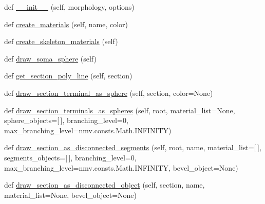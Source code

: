 \begin{DoxyCompactItemize}
\item 
def \hyperlink{classmeshy_1_1neuromorphovis_1_1builders_1_1skeleton_1_1skeleton__builder_1_1SkeletonBuilder_a26a5bc92b63c2dfc816c22da8e49f44f}{\+\_\+\+\_\+init\+\_\+\+\_\+} (self, morphology, options)
\item 
def \hyperlink{classmeshy_1_1neuromorphovis_1_1builders_1_1skeleton_1_1skeleton__builder_1_1SkeletonBuilder_aa112a3e82023451da265159ab6728535}{create\+\_\+materials} (self, name, color)
\item 
def \hyperlink{classmeshy_1_1neuromorphovis_1_1builders_1_1skeleton_1_1skeleton__builder_1_1SkeletonBuilder_a2c4bbfe9ee3f1a83360a3e31b442d56b}{create\+\_\+skeleton\+\_\+materials} (self)
\item 
def \hyperlink{classmeshy_1_1neuromorphovis_1_1builders_1_1skeleton_1_1skeleton__builder_1_1SkeletonBuilder_adf7597fdeec6d25ee9eebb9dd2906480}{draw\+\_\+soma\+\_\+sphere} (self)
\item 
def \hyperlink{classmeshy_1_1neuromorphovis_1_1builders_1_1skeleton_1_1skeleton__builder_1_1SkeletonBuilder_a9398918b53a00296767bcd00d5677f61}{get\+\_\+section\+\_\+poly\+\_\+line} (self, section)
\item 
def \hyperlink{classmeshy_1_1neuromorphovis_1_1builders_1_1skeleton_1_1skeleton__builder_1_1SkeletonBuilder_a48d0f49acda9882d913eee55b1692c1c}{draw\+\_\+section\+\_\+terminal\+\_\+as\+\_\+sphere} (self, section, color=None)
\item 
def \hyperlink{classmeshy_1_1neuromorphovis_1_1builders_1_1skeleton_1_1skeleton__builder_1_1SkeletonBuilder_a6f5c38313f473ffb6ee97c7c73ae9711}{draw\+\_\+section\+\_\+terminals\+\_\+as\+\_\+spheres} (self, root, material\+\_\+list=None, sphere\+\_\+objects=\mbox{[}$\,$\mbox{]}, branching\+\_\+level=0, max\+\_\+branching\+\_\+level=nmv.\+consts.\+Math.\+I\+N\+F\+I\+N\+I\+TY)
\item 
def \hyperlink{classmeshy_1_1neuromorphovis_1_1builders_1_1skeleton_1_1skeleton__builder_1_1SkeletonBuilder_ae4012d82f0b243dea302e85ef24f83c9}{draw\+\_\+section\+\_\+as\+\_\+disconnected\+\_\+segments} (self, root, name, material\+\_\+list=\mbox{[}$\,$\mbox{]}, segments\+\_\+objects=\mbox{[}$\,$\mbox{]}, branching\+\_\+level=0, max\+\_\+branching\+\_\+level=nmv.\+consts.\+Math.\+I\+N\+F\+I\+N\+I\+TY, bevel\+\_\+object=None)
\item 
def \hyperlink{classmeshy_1_1neuromorphovis_1_1builders_1_1skeleton_1_1skeleton__builder_1_1SkeletonBuilder_afe9e0e1f6b5e7b2af6a6a9c8cde37f9c}{draw\+\_\+section\+\_\+as\+\_\+disconnected\+\_\+object} (self, section, name, material\+\_\+list=None, bevel\+\_\+object=None)

\end{DoxyCompactItemize}
